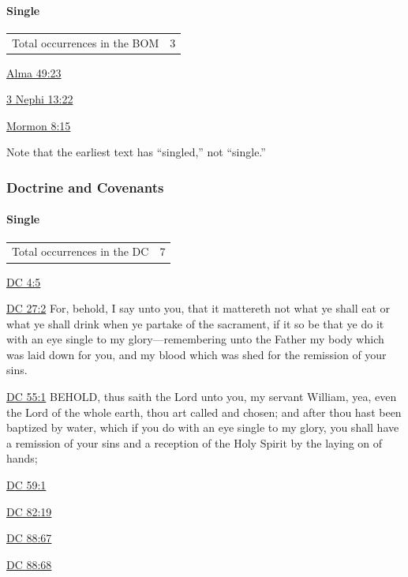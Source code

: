 		\paragraph{Single}
	
			\begin{tabular}{ll}
				Total occurrences in the BOM & 3
			\end{tabular}
			
			\begin{compactdesc}
				\item[{\hyperref[ALMA-49-23]{Alma 49:23}}]
				\item[{\hyperref[3NEPHI-13-22]{3 Nephi 13:22}}]
				\item[{\hyperref[MORMON-8-15]{Mormon 8:15}}]
					\begin{compactitem}
						\item Note that the earliest text has ``singled,'' not ``single.''
					\end{compactitem}
			\end{compactdesc}
		
	\subsubsection{Doctrine and Covenants} %
		\label{SINGLE-DC}
		
		\paragraph{Single}
	
			\begin{tabular}{ll}
				Total occurrences in the DC & 7
			\end{tabular}
			
			\begin{compactdesc}
				\item[{\hyperref[DC4-5]{DC 4:5}}]
				\item[{\hyperref[DC27-2]{DC 27:2}}] For, behold, I say unto you, that it mattereth not what ye shall eat or what ye shall drink when ye partake of the sacrament, if it so be that ye do it with an eye single to my glory---remembering unto the Father my body which was laid down for you, and my blood which was shed for the remission of your sins.
				\item[{\hyperref[DC55-1]{DC 55:1}}] BEHOLD, thus saith the Lord unto you, my servant William, yea, even the Lord of the whole earth, thou art called and chosen; and after thou hast been baptized by water, which if you do with an eye single to my glory, you shall have a remission of your sins and a reception of the Holy Spirit by the laying on of hands;
				\item[{\hyperref[DC59-1]{DC 59:1}}]
				\item[{\hyperref[DC82-19]{DC 82:19}}]
				\item[{\hyperref[DC88-67]{DC 88:67}}]
				\item[{\hyperref[DC88-68]{DC 88:68}}]
			\end{compactdesc}
			

